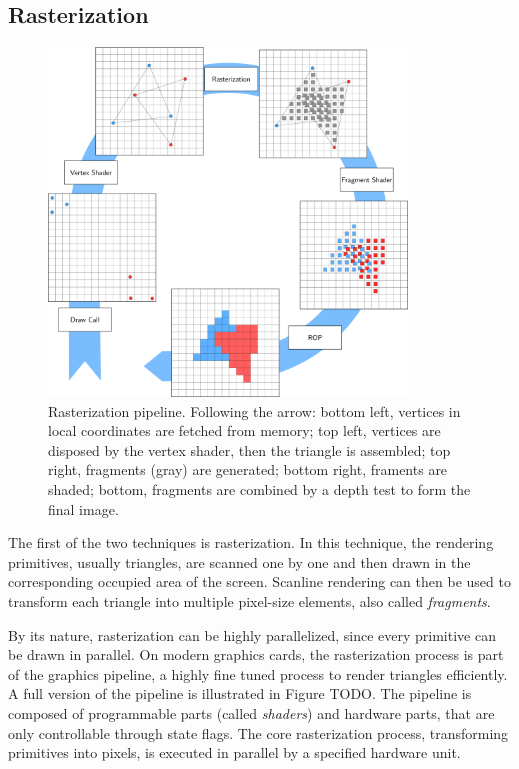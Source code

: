 \subsection{Rasterization}

\begin{figure}
\centering
	 \includegraphics[width=0.85\textwidth]{figures/rasterization_pipeline.pdf} 
\caption{Rasterization pipeline. Following the arrow: bottom left, vertices in local coordinates are fetched from memory; top left, vertices are disposed by the vertex shader, then the triangle is assembled; top right, fragments (gray) are generated; bottom right, framents are shaded; bottom, fragments are combined by a depth test to form the final image. } 
\label{fig:rasterpipeline}
\end{figure}


The first of the two techniques is rasterization. In this technique, the rendering primitives, usually triangles, are scanned one by one and then drawn in the corresponding occupied area of the screen. Scanline rendering can then be used to transform each triangle into multiple pixel-size elements, also called \emph{fragments}. 

By its nature, rasterization can be highly parallelized, since every primitive can be drawn in parallel. On modern graphics cards, the rasterization process is part of the graphics pipeline, a highly fine tuned process to render triangles efficiently. A full version of the pipeline is illustrated in Figure TODO. The pipeline is composed of programmable parts (called \emph{shaders}) and hardware parts, that are only controllable through state flags. The core rasterization process, transforming primitives into pixels, is executed in parallel by a specified hardware unit. 

